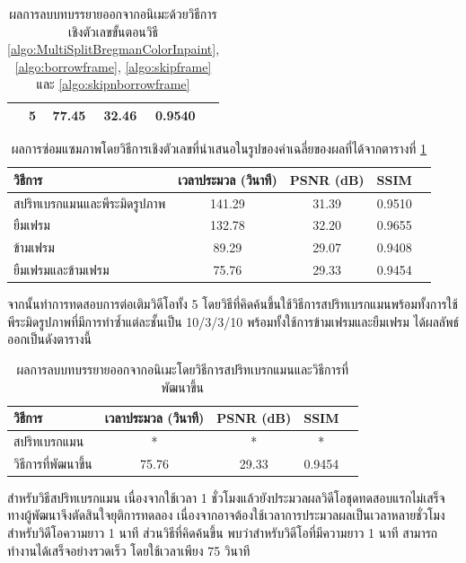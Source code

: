 \documentclass[hidelinks, a4paper,12pt]{article}
\numberwithin{equation}{section}							%
\numberwithin{equation}{section}
\begin{document}
{\begin{table}[H]
\begin{tabular}[ht]{|l|c|c|c|c|c|}
			& 5 & 77.45  & 32.46 & 0.9540 \\
			\hline
		\end{tabular}
		\label{result:table-removesub1}
		\caption{ผลการลบบทบรรยายออกจากอนิเมะด้วยวิธีการเชิงตัวเลขขั้นตอนวิธี \ref{algo:MultiSplitBregmanColorInpaint}, \ref{algo:borrowframe}, \ref{algo:skipframe} และ \ref{algo:skipnborrowframe}}
	\end{table}	
	\begin{table}[H]
		\centering
		\begin{tabular}[ht]{|l|c|c|c|c|}
			\hline
			วิธีการ  & เวลาประมวล  (วินาที) & PSNR (dB) & SSIM \\
			\hline
			สปริทเบรกแมนและพีระมิดรูปภาพ & 141.29 & 31.39  &  0.9510\\
			ยืมเฟรม & 132.78 & 32.20 & 0.9655\\
			ข้ามเฟรม & 89.29 & 29.07 & 0.9408 \\
			ยืมเฟรมและข้ามเฟรม & 75.76 & 29.33 & 0.9454 \\
			\hline
		\end{tabular}
		\caption{ผลการซ่อมแซมภาพโดยวิธีการเชิงตัวเลขที่นำเสนอในรูปของค่าเฉลี่ยของผลที่ได้จากตารางที่ \ref{result:table-removesub1}}
	\end{table}	
	
	\hspace{1cm}  จากนั้นทำการทดสอบการต่อเติมวิดีโอทั้ง 5 โดยวิธีที่คิดค้นขึ้นใช้วิธีการสปริทเบรกแมนพร้อมทั้งการใช้พีระมิดรูปภาพที่มีการทำซ้ำแต่ละชั้นเป็น 10/3/3/10  พร้อมทั้งใช้การข้ามเฟรมและยืมเฟรม ได้ผลลัพธ์ออกเป็นดังตารางนี้
	 
\begin{table}[H]
	\centering
	\begin{tabular}[ht]{|l|c|c|c|c|}
		\hline
		วิธีการ  & เวลาประมวล  (วินาที) & PSNR (dB) & SSIM \\
		\hline
		สปริทเบรกแมน & * & * & * \\
		วิธีการที่พัฒนาขึ้น & 75.76 & 29.33 & 0.9454 \\
		\hline
	\end{tabular}
	\caption{ผลการลบบทบรรยายออกจากอนิเมะโดยวิธีการสปริทเบรกแมนและวิธีการที่พัฒนาขึ้น}
\end{table}	

\hspace{1cm} สำหรับวิธีสปริทเบรกแมน เนื่องจากใช้เวลา 1 ชั่วโมงแล้วยังประมวลผลวิดีโอชุดทดสอบแรกไม่เสร็จ ทางผู้พัฒนาจึงตัดสินใจยุติการทดลอง เนื่องจากอาจต้องใช้เวลาการประมวลผลเป็นเวลาหลายชั่วโมงสำหรับวิดีโอความยาว 1 นาที ส่วนวิธีที่คิดค้นขึ้น พบว่าสำหรับวิดีโอที่มีความยาว 1 นาที สามารถทำงานได้เสร็จอย่างรวดเร็ว โดยใช้เวลาเพียง 75 วินาที

}
\end{document}
